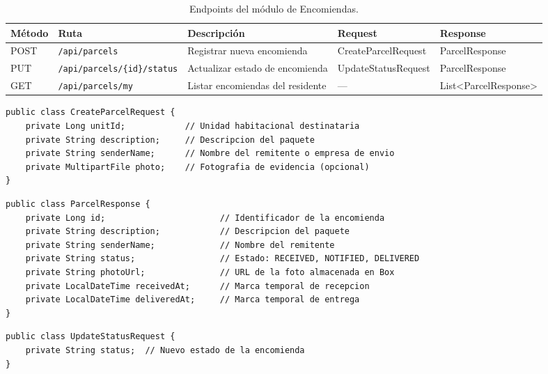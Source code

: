 \begin{table}[H]
\centering
\small
\begin{tabular}{|p{}|p{}|p{}|p{}|p{}|}
\hline
\textbf{Método} & \textbf{Ruta} & \textbf{Descripción} & \textbf{Request} & \textbf{Response} \\\hline
POST & \texttt{/api/parcels} & Registrar nueva encomienda & CreateParcel\-Request & Parcel\-Response \\\hline
PUT & \texttt{/api/parcels/\{id\}/status} & Actualizar estado de encomienda & UpdateStatus\-Request & Parcel\-Response \\\hline
GET & \texttt{/api/parcels/my} & Listar encomiendas del residente & --- & List<Parcel\-Response> \\\hline
\end{tabular}
\caption{Endpoints del módulo de Encomiendas.}
\label{tab:endpoints-encomiendas}
\end{table}

\begin{lstlisting}[style=javadto, title={\texttt{CreateParcelRequest}}]
public class CreateParcelRequest {
    private Long unitId;            // Unidad habitacional destinataria
    private String description;     // Descripcion del paquete
    private String senderName;      // Nombre del remitente o empresa de envio
    private MultipartFile photo;    // Fotografia de evidencia (opcional)
}
\end{lstlisting}

\begin{lstlisting}[style=javadto, title={\texttt{ParcelResponse}}]
public class ParcelResponse {
    private Long id;                       // Identificador de la encomienda
    private String description;            // Descripcion del paquete
    private String senderName;             // Nombre del remitente
    private String status;                 // Estado: RECEIVED, NOTIFIED, DELIVERED
    private String photoUrl;               // URL de la foto almacenada en Box
    private LocalDateTime receivedAt;      // Marca temporal de recepcion
    private LocalDateTime deliveredAt;     // Marca temporal de entrega
}
\end{lstlisting}

\begin{lstlisting}[style=javadto, title={\texttt{UpdateStatusRequest}}]
public class UpdateStatusRequest {
    private String status;  // Nuevo estado de la encomienda
}
\end{lstlisting}

